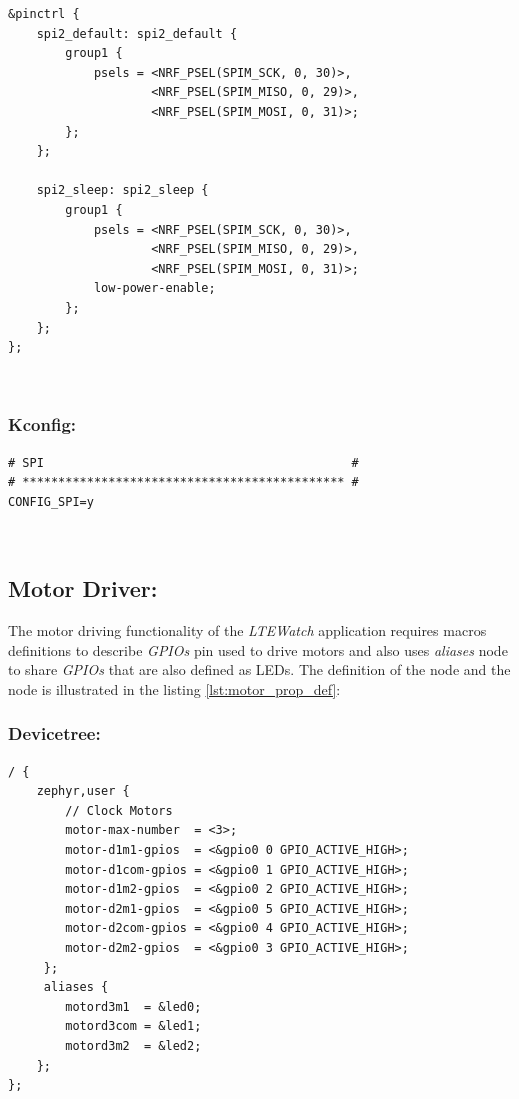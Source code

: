 \documentclass[report.tex]{subfiles}
\begin{document}
\pagebreak

\begin{lstlisting}[style=C,label={lst:spi_pinctrl},caption={\textit{DT SPI} Pinctrl Description}]
&pinctrl {
	spi2_default: spi2_default {
		group1 {
			psels = <NRF_PSEL(SPIM_SCK, 0, 30)>,
					<NRF_PSEL(SPIM_MISO, 0, 29)>,
					<NRF_PSEL(SPIM_MOSI, 0, 31)>;
		};
	};

	spi2_sleep: spi2_sleep {
		group1 {
			psels = <NRF_PSEL(SPIM_SCK, 0, 30)>,
					<NRF_PSEL(SPIM_MISO, 0, 29)>,
					<NRF_PSEL(SPIM_MOSI, 0, 31)>;
			low-power-enable;
		};
	};
};
\end{lstlisting}
\;\\[-60pt]
\subsubsection{Kconfig:}

\begin{lstlisting}[style=console,label={lst:spi_conf},caption={Application \textit{SPI} Configuration}]
# SPI                                           #
# ********************************************* #
CONFIG_SPI=y
\end{lstlisting}
\;\\[-50pt]
\subsection{Motor Driver:}
The motor driving functionality of the \textit{LTEWatch} application requires macros definitions to describe \textit{GPIOs} pin used to drive motors and also uses \textit{aliases} node to share \textit{GPIOs} that are also defined as LEDs. The definition of the  node and the  node is illustrated in the listing \ref{lst:motor_prop_def}:
\subsubsection{Devicetree:}

\begin{lstlisting}[style=C,label={lst:motor_prop_def},caption={\textit{DT Motor} Proprieties and Aliases Description}]
/ {
	zephyr,user {
		// Clock Motors
		motor-max-number  = <3>;
		motor-d1m1-gpios  = <&gpio0 0 GPIO_ACTIVE_HIGH>;
		motor-d1com-gpios = <&gpio0 1 GPIO_ACTIVE_HIGH>;
		motor-d1m2-gpios  = <&gpio0 2 GPIO_ACTIVE_HIGH>;
		motor-d2m1-gpios  = <&gpio0 5 GPIO_ACTIVE_HIGH>;
		motor-d2com-gpios = <&gpio0 4 GPIO_ACTIVE_HIGH>;
		motor-d2m2-gpios  = <&gpio0 3 GPIO_ACTIVE_HIGH>;
	 };
	 aliases {
		motord3m1  = &led0;
		motord3com = &led1;
		motord3m2  = &led2;
	};
};
\end{lstlisting}
\end{document}
